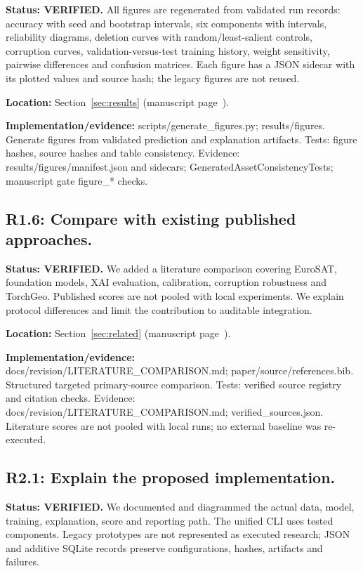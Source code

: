\documentclass[3p,times,procedia]{elsarticle}
\begin{document}
\textbf{Status: VERIFIED.} All figures are regenerated from validated run records: accuracy with seed and bootstrap intervals, six components with intervals, reliability diagrams, deletion curves with random/least-salient controls, corruption curves, validation-versus-test training history, weight sensitivity, pairwise differences and confusion matrices. Each figure has a JSON sidecar with its plotted values and source hash; the legacy figures are not reused.

\par\textbf{Location:} Section~\ref{sec:results} (manuscript page~\pageref{sec:results}).

\par\textbf{Implementation/evidence:} scripts/generate\_figures.py; results/figures. Generate figures from validated prediction and explanation artifacts. Tests: figure hashes, source hashes and table consistency. Evidence: results/figures/manifest.json and sidecars; GeneratedAssetConsistencyTests; manuscript gate figure\_* checks.

\subsection*{R1.6: Compare with existing published approaches.}

\textbf{Status: VERIFIED.} We added a literature comparison covering EuroSAT, foundation models, XAI evaluation, calibration, corruption robustness and TorchGeo. Published scores are not pooled with local experiments. We explain protocol differences and limit the contribution to auditable integration.

\par\textbf{Location:} Section~\ref{sec:related} (manuscript page~\pageref{sec:related}).

\par\textbf{Implementation/evidence:} docs/revision/LITERATURE\_COMPARISON.md; paper/source/references.bib. Structured targeted primary-source comparison. Tests: verified source registry and citation checks. Evidence: docs/revision/LITERATURE\_COMPARISON.md; verified\_sources.json. Literature scores are not pooled with local runs; no external baseline was re-executed.

\subsection*{R2.1: Explain the proposed implementation.}

\textbf{Status: VERIFIED.} We documented and diagrammed the actual data, model, training, explanation, score and reporting path. The unified CLI uses tested components. Legacy prototypes are not represented as executed research; JSON and additive SQLite records preserve configurations, hashes, artifacts and failures.
\end{document}

